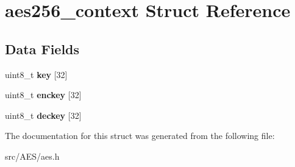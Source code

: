 \hypertarget{structaes256__context}{}\section{aes256\+\_\+context Struct Reference}
\label{structaes256__context}
\subsection*{Data Fields}
\begin{DoxyCompactItemize}
\item 
uint8\+\_\+t {\bfseries key} \mbox{[}32\mbox{]}\hypertarget{structaes256__context_a42363914b961236c71004e83b3b66a1b}{}\label{structaes256__context_a42363914b961236c71004e83b3b66a1b}

\item 
uint8\+\_\+t {\bfseries enckey} \mbox{[}32\mbox{]}\hypertarget{structaes256__context_a1a0b41bfcc668b29fb27886b61fd7f4d}{}\label{structaes256__context_a1a0b41bfcc668b29fb27886b61fd7f4d}

\item 
uint8\+\_\+t {\bfseries deckey} \mbox{[}32\mbox{]}\hypertarget{structaes256__context_a581a854468843abed0c47b9cf754e7d7}{}\label{structaes256__context_a581a854468843abed0c47b9cf754e7d7}

\end{DoxyCompactItemize}


The documentation for this struct was generated from the following file\+:\begin{DoxyCompactItemize}
\item 
src/\+A\+E\+S/aes.\+h\end{DoxyCompactItemize}
